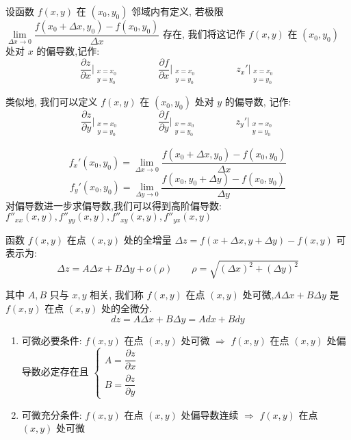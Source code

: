 \begin{definition}[偏导数]
	
	设函数 $f(x,y)$ 在 $(x_{0},y_{0})$ 邻域内有定义, 若极限 $\lim\limits_{\Delta x\rightarrow 0}\dfrac{f(x_{0}+\Delta x,y_{0})-f(x_{0},y_{0})}{\Delta x}$ 存在,
	我们将这记作 $f(x,y)$ 在 $(x_{0},y_{0})$ 处对 $x$ 的偏导数,记作: 
	$$\dfrac{\partial z}{\partial x}\big|_{\substack{x=x_{0}\\y=y_{0}}}\qquad\qquad 
	\dfrac{\partial f}{\partial x}\big|_{\substack{x=x_{0}\\y=y_{0}}}\qquad\qquad
	z_{x}'\big|_{\substack{x=x_{0}\\y=y_{0}}}$$

	类似地, 我们可以定义 $f(x,y)$ 在 $(x_{0},y_{0})$ 处对 $y$ 的偏导数, 记作:
	$$\dfrac{\partial z}{\partial y}\big|_{\substack{x=x_{0}\\y=y_{0}}}\qquad\qquad
	\dfrac{\partial f}{\partial y}\big|_{\substack{x=x_{0}\\y=y_{0}}}\qquad\qquad
	z_{y}'\big|_{\substack{x=x_{0}\\y=y_{0}}}$$

	$$f_{x}'(x_{0},y_{0}) = \lim\limits_{\Delta x\rightarrow 0}\dfrac{f(x_{0}+\Delta x,y_{0})-f(x_{0},y_{0})}{\Delta x}$$
	$$f_{y}'(x_{0},y_{0}) = \lim\limits_{\Delta y\rightarrow 0}\dfrac{f(x_{0},y_{0}+\Delta y)-f(x_{0},y_{0})}{\Delta y}$$
	对偏导数进一步求偏导数,我们可以得到高阶偏导数: $f''_{xx}(x,y),f''_{yy}(x,y),f''_{xy}(x,y),f''_{yx}(x,y)$
\end{definition}
\begin{definition}[可微]
	
	函数 $f(x,y)$ 在点 $(x,y)$ 处的全增量 $\Delta z=f(x+\Delta x,y+\Delta y)-f(x,y)$ 可表示为: 
	$$\Delta z=A\Delta x+B\Delta y+o(\rho)\qquad \rho=\sqrt{(\Delta x)^2+(\Delta y)^2}$$
	
	其中 $A,B$ 只与 $x,y$ 相关, 我们称 $f(x,y)$ 在点 $(x,y)$ 处可微,$A\Delta x+B\Delta y$ 是 $f(x,y)$ 在点 $(x,y)$ 处的全微分.
	$$dz=A\Delta x+B\Delta y=Adx+Bdy$$
	\begin{enumerate}
		\item 可微必要条件: $f(x,y)$ 在点 $(x,y)$ 处可微 $\Rightarrow$ $f(x,y)$ 在点 $(x,y)$ 处偏导数必定存在且 $\begin{cases} A = \dfrac{\partial z}{\partial x}  \\ B = \dfrac{\partial z}{\partial y}\end{cases}$
		\item 可微充分条件: $f(x,y)$ 在点 $(x,y)$ 处偏导数连续 $\Rightarrow$ $f(x,y)$ 在点 $(x,y)$ 处可微
	\end{enumerate}
\end{definition}
